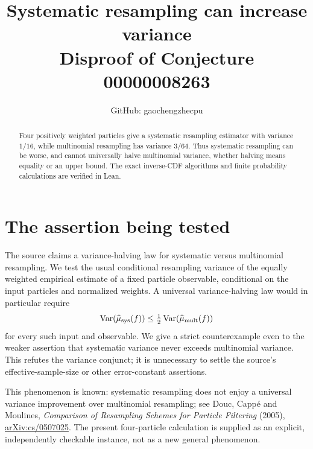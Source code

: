\documentclass[11pt]{article}
\title{Systematic resampling can increase variance\\
\large Disproof of Conjecture 00000008263}
\author{GitHub: gaochengzhecpu}\date{}
\begin{document}
\maketitle
\begin{abstract}
Four positively weighted particles give a systematic resampling estimator
with variance $1/16$, while multinomial resampling has variance $3/64$.
Thus systematic resampling can be worse, and cannot universally halve
multinomial variance, whether halving means equality or an upper bound.
The exact inverse-CDF algorithms and finite probability calculations
are verified in Lean.
\end{abstract}

\section*{The assertion being tested}
The source claims a variance-halving law for systematic versus multinomial
resampling. We test the usual conditional resampling variance of the
equally weighted empirical estimate of a fixed particle observable,
conditional on the input particles and normalized weights. A universal
variance-halving law would in particular require
\[
 \operatorname{Var}(\widehat\mu_{\rm sys}(f))
 \leq\tfrac12\operatorname{Var}(\widehat\mu_{\rm mult}(f))
\]
for every such input and observable. We give a strict counterexample even
to the weaker assertion that systematic variance never exceeds multinomial
variance. This refutes the variance conjunct; it is unnecessary to settle
the source's effective-sample-size or other error-constant assertions.

This phenomenon is known: systematic resampling does not enjoy a universal
variance improvement over multinomial resampling; see Douc, Capp\'e and
Moulines, \emph{Comparison of Resampling Schemes for Particle Filtering}
(2005), \href{https://arxiv.org/abs/cs/0507025}{arXiv:cs/0507025}.
The present four-particle calculation is supplied as an explicit,
independently checkable instance, not as a new general phenomenon.
\end{document}

